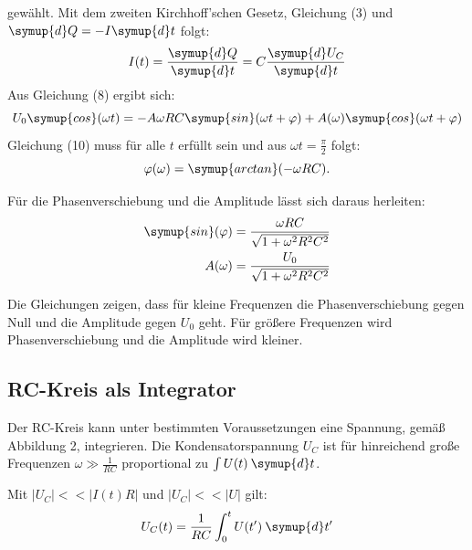 gewählt. Mit dem zweiten Kirchhoff'schen Gesetz, Gleichung (3) und $\symup{d}Q = -I\symup{d}t$ folgt:
\begin{equation}
  I(t) = \frac{\symup{d}Q}{\symup{d}t} = C\frac{\symup{d}U_C}{\symup{d}t}
\end{equation}
Aus Gleichung (8) ergibt sich:
\begin{equation}
  U_0 \symup{cos}(\omega t) = -A \omega RC \symup{sin}(\omega t + \varphi) + A(\omega) \symup{cos}(\omega t + \varphi)
\end{equation}
Gleichung (10) muss für alle $t$ erfüllt sein und aus $\omega t = \frac{\pi}{2}$ folgt:
\begin{equation}
  \varphi (\omega) = \symup{arctan} (-\omega RC).
\end{equation}

Für die Phasenverschiebung und die Amplitude lässt sich daraus herleiten:
\begin{align}
  \symup{sin}(\varphi) &= \frac{\omega RC}{\sqrt{1 + \omega^2 R^2C^2}} \\
  A(\omega) &= \frac{U_0}{\sqrt{1 + \omega^2 R^2C^2}}
\end{align}

Die Gleichungen zeigen, dass für kleine Frequenzen die Phasenverschiebung gegen Null und die Amplitude
gegen $U_0$ geht. Für größere Frequenzen wird Phasenverschiebung und die Amplitude wird kleiner.

\subsection{RC-Kreis als Integrator}
Der RC-Kreis kann unter bestimmten Voraussetzungen eine Spannung, gemäß Abbildung 2, integrieren.
Die Kondensatorspannung $U_C$ ist für hinreichend große Frequenzen $\omega \gg \frac{1}{RC}$ proportional
zu $\int U(t) \: \symup{d}t$.

Mit $|U_C| << |I(t)R|$ und $|U_C| << |U|$ gilt:
\begin{equation}
  U_C(t) = \frac{1}{RC} \int_{0}^{t} U(t') \: \symup{d}t'
\end{equation}
